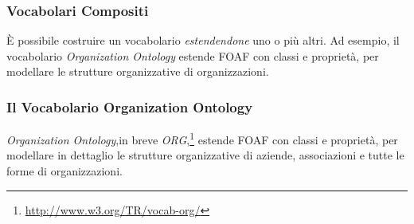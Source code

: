 \documentclass[8pt]{beamer}
\begin{document}
\begin{frame}
\frametitle{Vocabolari Compositi}

\`E possibile costruire un vocabolario \emph{estendendone} uno o pi\`u altri.
Ad esempio, il vocabolario \emph{Organization Ontology} 
estende FOAF con classi e propriet\`a, per modellare le strutture organizzative 
di organizzazioni.
\vspace{\baselineskip}

\end{frame}

\begin{frame}
\frametitle{Il Vocabolario Organization Ontology}

\emph{Organization Ontology},in breve \emph{ORG},\footnote{\url{http://www.w3.org/TR/vocab-org/}}
estende FOAF con classi e propriet\`a, per modellare in dettaglio 
le strutture organizzative di aziende, associazioni e tutte le forme 
di organizzazioni.
\vspace{\baselineskip}


\end{frame}

\newcommand{\org}{\mathtt{ORG}}
\end{document}
